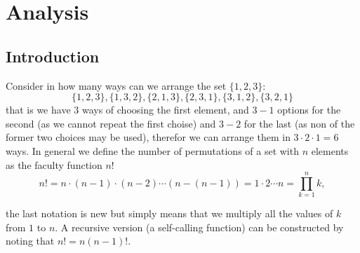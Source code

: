 \chapter{Analysis}
\section{Introduction}
Consider in how many ways can we arrange the set $\{1,2,3\}$: 
\[
\{1, 2, 3\}, \{1, 3, 2\}, \{2, 1, 3\}, \{2, 3, 1\}, \{3, 1, 2\}, \{3, 2, 1\}
\]
that is we have $3$ ways of choosing the first element, and $3-1$ options for the second
(as we cannot repeat the first choise) and $3-2$ for the last (as non of the former two choices may be used),
therefor we can arrange them in $3 \cdot 2 \cdot 1 = 6$ ways. In general we define the number of 
permutations of a set with $n$ elements as the faculty function $n!$
\[
n! = n \cdot (n-1) \cdot (n-2) \cdots  (n - (n -1)) = 1 \cdot 2 \cdots n = \prod_{k=1}^{n}k, 
\]

the last notation is new but simply means that we multiply all the values of $k$ from $1$
to $n$. A recursive version (a self-calling function) can be constructed by noting that $n! =
n(n-1)!$. \\


